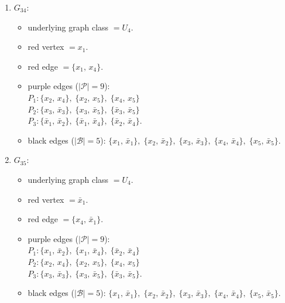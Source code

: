 \begin{enumerate}[leftmargin=*]
\begin{itemize}[leftmargin=*]
$P_{2}: \{x_{2},\,x_{4}\},\; \{x_{2},\,\bar{x}_{4}\},\; \{x_{4},\,\bar{x}_{4}\}$\\
$P_{3}: \{x_{3},\,\bar{x}_{3}\},\; \{x_{3},\,\bar{x}_{5}\},\; \{\bar{x}_{3},\,\bar{x}_{5}\}$.
\item black edges ($|\mathcal{B}|=5$): $\{x_{1},\,\bar{x}_{1}\},\; \{x_{2},\,\bar{x}_{2}\},\; \{x_{3},\,\bar{x}_{3}\},\; \{x_{4},\,\bar{x}_{4}\},\; \{x_{5},\,\bar{x}_{5}\}$.
\end{itemize}
\item $G_{34}$:
\begin{itemize}[leftmargin=*]
\item underlying graph class $= U_4$.
\item red vertex $= x_{1}$.
\item red edge $= \{x_{1},\,x_{4}\}$.
\item purple edges ($|\mathcal{P}|=9$):\mbox{}\\
$P_{1}: \{x_{2},\,x_{4}\},\; \{x_{2},\,x_{5}\},\; \{x_{4},\,x_{5}\}$\\
$P_{2}: \{x_{3},\,\bar{x}_{3}\},\; \{x_{3},\,\bar{x}_{5}\},\; \{\bar{x}_{3},\,\bar{x}_{5}\}$\\
$P_{3}: \{\bar{x}_{1},\,\bar{x}_{2}\},\; \{\bar{x}_{1},\,\bar{x}_{4}\},\; \{\bar{x}_{2},\,\bar{x}_{4}\}$.
\item black edges ($|\mathcal{B}|=5$): $\{x_{1},\,\bar{x}_{1}\},\; \{x_{2},\,\bar{x}_{2}\},\; \{x_{3},\,\bar{x}_{3}\},\; \{x_{4},\,\bar{x}_{4}\},\; \{x_{5},\,\bar{x}_{5}\}$.
\end{itemize}
\item $G_{35}$:
\begin{itemize}[leftmargin=*]
\item underlying graph class $= U_4$.
\item red vertex $= \bar{x}_{1}$.
\item red edge $= \{x_{4},\,\bar{x}_{1}\}$.
\item purple edges ($|\mathcal{P}|=9$):\mbox{}\\
$P_{1}: \{x_{1},\,\bar{x}_{2}\},\; \{x_{1},\,\bar{x}_{4}\},\; \{\bar{x}_{2},\,\bar{x}_{4}\}$\\
$P_{2}: \{x_{2},\,x_{4}\},\; \{x_{2},\,x_{5}\},\; \{x_{4},\,x_{5}\}$\\
$P_{3}: \{x_{3},\,\bar{x}_{3}\},\; \{x_{3},\,\bar{x}_{5}\},\; \{\bar{x}_{3},\,\bar{x}_{5}\}$.
\item black edges ($|\mathcal{B}|=5$): $\{x_{1},\,\bar{x}_{1}\},\; \{x_{2},\,\bar{x}_{2}\},\; \{x_{3},\,\bar{x}_{3}\},\; \{x_{4},\,\bar{x}_{4}\},\; \{x_{5},\,\bar{x}_{5}\}$.

\end{itemize}
\end{enumerate}
